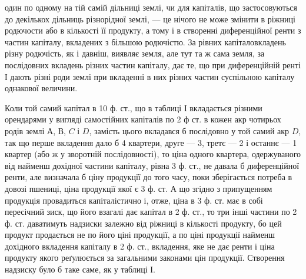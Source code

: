 \parcont{}  %
один по одному на тій самій дільниці землі, чи для капіталів, що застосовуються
до декількох дільниць різнорідної землі, — це нічого не може змінити в ріжниці
родючости або в кількості її продукту, а тому і в створенні диференційної
ренти з частин капіталу, вкладених з більшою родючістю. За рівних капіталовкладень
різну родючість, як і давніш, виявляє земля, але тут та ж сама земля,
за послідовних вкладень різних частин капіталу, дає те, що при диференційній
ренті І дають різні роди землі при вкладенні в них різних частин суспільною
капіталу однакової величини.

Коли той самий капітал в 10 ф. ст., що в таблиці І вкладається різними орендарями
у вигляді самостійних капіталів по 2 ф ст. в кожен акр чотирьох родів
землі $А$, $В$, $C$ і $D$, замість цього вкладався б послідовно у той самий акр
$D$, так що перше вкладення дало б 4 квартери, друге — 3, третє — 2 і останнє
— 1 квартер (або ж у зворотній послідовності), то ціна одного квартера, одержуваного
від найменш дохідної частини капіталу, рівна 3 ф. ст., не давала б диференційної
ренти, але визначала б ціну продукції до того часу, поки зберігається
потреба в довозі пшениці, ціна продукції якої є 3 ф. ст. А що згідно з припущенням
продукція провадиться капіталістично і, отже, ціна в 3 ф. ст. має
в собі пересічний зиск, що його взагалі дає капітал в 2 ф. ст., то три інші
частини по 2 ф. ст. даватимуть надзиски залежно від ріжниці в кількості
продукту, бо цей продукт продається не по його ціні продукції, а по ціні продукції
найменш дохідного вкладення капіталу в 2 ф. ст., вкладення, яке не дає ренти
і ціна продукту якого реґулюється за загальними законами цін продукції. Створення
надзиску було б таке саме, як у таблиці І.

